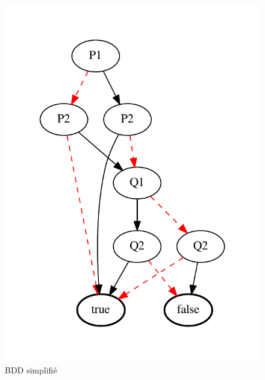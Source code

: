 \documentclass[a4paper,11pt]{article}
\begin{document}
\begin{figure}[!htb]
  \begin{minipage}{0.25\textwidth}
    \centering
    \includegraphics[width=0.8\linewidth]{tests_rapport/test1_simplified_bdd.pdf}
    \caption*{BDD simplifié}
  \end{minipage}
\end{figure}
\end{document}
